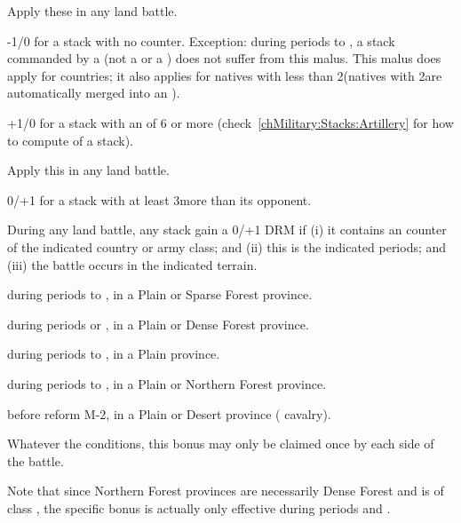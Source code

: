  Apply these in any land battle.
\begin{modlist}
\item[-1/0] for a stack with no \ARMY counter. Exception: during periods
   to , a stack commanded by a \LeaderC (not a \LeaderGov
  or a \LeaderE) does not suffer from this malus. This malus does apply for
  \ROTW countries; it also applies for natives with less than 2\LD (natives
  with 2\LD are automatically merged into an \ARMY\Facemoins).
\item[+1/0] for a stack with an  of 6 or more
  (check~\ref{chMilitary:Stacks:Artillery} for how to compute  of a stack).
\end{modlist}

 Apply this in any land battle.
\begin{modlist}
\item[0/+1] for a stack with at least 3\LD more than its opponent.
\end{modlist}

 During any land battle, any stack gain
a 0/+1 DRM if (i) it contains an \ARMY counter of the indicated country or
army class; and (ii) this is the indicated periods; and (iii) the battle
occurs in the indicated terrain.
\begin{modlist}
\item[\CAIIM] during periods  to , in a Plain or Sparse
  Forest province.
\item[\CAIIIM] during periods  or , in a Plain or Dense
  Forest province.
\item[\CAIV] during periods  to , in a Plain province.
\item[\SUE] during periods  to , in a Plain or Northern
  Forest province.
\item[\TUR] before reform M-2, in a Plain or Desert province (
  cavalry).
\end{modlist}
Whatever the conditions, this bonus may only be claimed once by each side of
the battle.

Note that since Northern Forest provinces are necessarily Dense Forest and
\SUE is of class \CAIIIM, the specific \SUE bonus is actually only effective
during periods  and .

